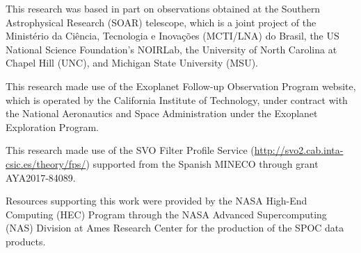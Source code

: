 \documentclass[12pt,twocolumn,tighten]{aastex63}
\begin{document}
This research was based in part on observations obtained at the
Southern Astrophysical Research (SOAR) telescope, which is a joint
project of the Minist\'{e}rio da Ci\^{e}ncia, Tecnologia e
Inova\c{c}\~{o}es (MCTI/LNA) do Brasil, the US National Science
Foundation's NOIRLab, the University of North Carolina at Chapel Hill
(UNC), and Michigan State University (MSU).

This research made use of the Exoplanet Follow-up Observation
Program website, which is operated by the California Institute of
Technology, under contract with the National Aeronautics and Space
Administration under the Exoplanet Exploration Program.

This research made use of the SVO Filter Profile Service
(\url{http://svo2.cab.inta-csic.es/theory/fps/}) supported from the Spanish
MINECO through grant AYA2017-84089.

Resources supporting this work were provided by the NASA High-End
Computing (HEC) Program through the NASA Advanced Supercomputing (NAS)
Division at Ames Research Center for the production of the SPOC data
products.
%
\end{document}
